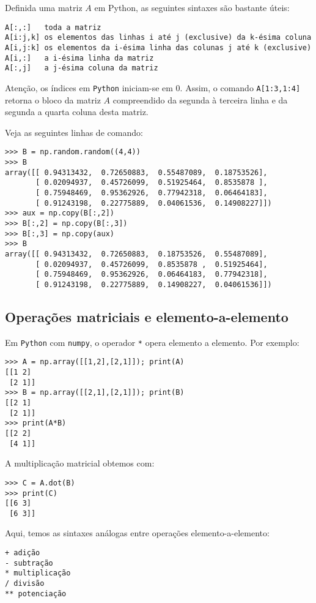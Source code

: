 Definida uma matriz $A$ em Python, as seguintes sintaxes são bastante úteis:
\begin{verbatim}
A[:,:]   toda a matriz
A[i:j,k] os elementos das linhas i até j (exclusive) da k-ésima coluna
A[i,j:k] os elementos da i-ésima linha das colunas j até k (exclusive)
A[i,:]   a i-ésima linha da matriz
A[:,j]   a j-ésima coluna da matriz
\end{verbatim}

Atenção, os índices em \verb+Python+ iniciam-se em $0$. Assim, o comando \verb+A[1:3,1:4]+ retorna o bloco da matriz $A$ compreendido da segunda à terceira linha e da segunda a quarta coluna desta matriz.

\begin{ex}
Veja as seguintes linhas de comando:
\begin{verbatim}
>>> B = np.random.random((4,4))
>>> B
array([[ 0.94313432,  0.72650883,  0.55487089,  0.18753526],
       [ 0.02094937,  0.45726099,  0.51925464,  0.8535878 ],
       [ 0.75948469,  0.95362926,  0.77942318,  0.06464183],
       [ 0.91243198,  0.22775889,  0.04061536,  0.14908227]])
>>> aux = np.copy(B[:,2])
>>> B[:,2] = np.copy(B[:,3])
>>> B[:,3] = np.copy(aux)
>>> B
array([[ 0.94313432,  0.72650883,  0.18753526,  0.55487089],
       [ 0.02094937,  0.45726099,  0.8535878 ,  0.51925464],
       [ 0.75948469,  0.95362926,  0.06464183,  0.77942318],
       [ 0.91243198,  0.22775889,  0.14908227,  0.04061536]])
\end{verbatim}
\end{ex}

\subsection{Operações matriciais e elemento-a-elemento}

Em \verb+Python+ com \verb+numpy+, o operador \verb+*+ opera elemento a elemento. Por exemplo:
\begin{verbatim}
>>> A = np.array([[1,2],[2,1]]); print(A)
[[1 2]
 [2 1]]
>>> B = np.array([[2,1],[2,1]]); print(B)
[[2 1]
 [2 1]]
>>> print(A*B)
[[2 2]
 [4 1]]
\end{verbatim}
A multiplicação matricial obtemos com:
\begin{verbatim}
>>> C = A.dot(B)
>>> print(C)
[[6 3]
 [6 3]]
\end{verbatim}

Aqui, temos as sintaxes análogas entre operações elemento-a-elemento:
\begin{verbatim}
+ adição
- subtração
* multiplicação
/ divisão
** potenciação
\end{verbatim}

